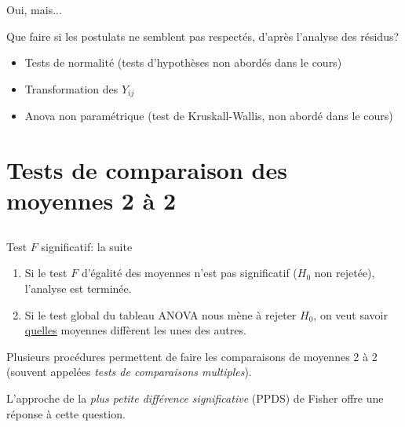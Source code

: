 \documentclass{BeamerTemplate}
\begin{document}
\begin{frame}[t]{Oui, mais...}

Que faire si les postulats ne semblent pas respectés, d'après l'analyse des résidus?

\medskip
\begin{itemize}\itemsep1.3cm
\item Tests de normalité (tests d'hypothèses non abordés dans le cours)
\item Transformation des $Y_{ij}$
\item Anova non paramétrique (test de Kruskall-Wallis, non abordé dans le cours)
\end{itemize}
\end{frame}


\section[Comparaisons 2 à 2]{Tests de comparaison des moyennes 2 à 2}\label{sec:ppds1fac}
\subsection*{ }

\begin{frame}[t]{Test $F$ significatif: la suite}

\begin{enumerate}
\item Si le test $F$ d'égalité des moyennes n'est pas significatif ($H_0$ non rejetée), l'analyse est terminée.
\vspace{.7cm}

\item Si le test global du tableau ANOVA nous mène à rejeter $H_0$, on veut savoir \underline{quelles} moyennes diff\`erent les unes des autres.
\vspace{.5cm}
\end{enumerate}

Plusieurs procédures permettent de faire les comparaisons de moyennes 2 \`a 2 (souvent appelées {\it tests de comparaisons multiples}).
\vspace{.5cm}

L'approche de la \alert{{\em plus petite différence significative} (PPDS)} de Fisher offre une réponse à cette question.
\end{frame}
\end{document}
